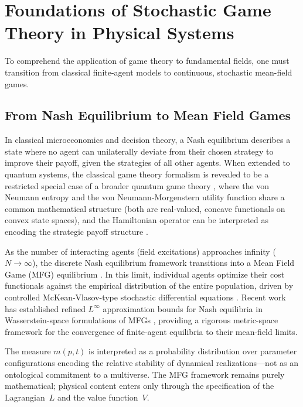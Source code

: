 \documentclass[12pt,a4paper]{article}
\theoremstyle{remark}
\begin{document}
\section{Foundations of Stochastic Game Theory in Physical Systems}
\label{sec:foundations}

To comprehend the application of game theory to fundamental fields, one must transition from classical finite-agent models to continuous, stochastic mean-field games.

\subsection{From Nash Equilibrium to Mean Field Games}

In classical microeconomics and decision theory, a Nash equilibrium \citep{Nash1950} describes a state where no agent can unilaterally deviate from their chosen strategy to improve their payoff, given the strategies of all other agents. When extended to quantum systems, the classical game theory formalism is revealed to be a restricted special case of a broader quantum game theory \citep{QuantumOptimization}, where the von Neumann entropy and the von Neumann-Morgenstern utility function share a common mathematical structure (both are real-valued, concave functionals on convex state spaces), and the Hamiltonian operator can be interpreted as encoding the strategic payoff structure \citep{Abel2023,QuantumOptimization}.

As the number of interacting agents (field excitations) approaches infinity ($N \to \infty$), the discrete Nash equilibrium framework transitions into a Mean Field Game (MFG) equilibrium \citep{LasryLions2007}. In this limit, individual agents optimize their cost functionals against the empirical distribution of the entire population, driven by controlled McKean-Vlasov-type stochastic differential equations \citep{LasryLions2006}. Recent work has established refined $L^\infty$ approximation bounds for Nash equilibria in Wasserstein-space formulations of MFGs \cite{DjeteTouzi2026}, providing a rigorous metric-space framework for the convergence of finite-agent equilibria to their mean-field limits.

The measure $m(p,t)$ is interpreted as a probability distribution over parameter configurations encoding the relative stability of dynamical realizations---not as an ontological commitment to a multiverse. The MFG framework remains purely mathematical; physical content enters only through the specification of the Lagrangian~$L$ and the value function~$V$.
\end{document}
